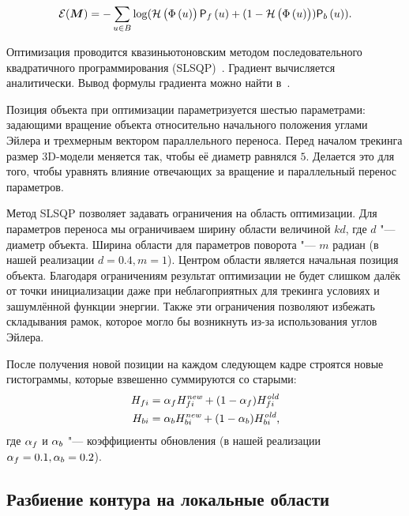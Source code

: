 \begin{equation}\label{eqn:err_func}
    \mathcal{E}(\bm{M}) = - \sum\limits_{\mathnormal{u} \in B}
        \log(\mathcal{H} \left( \Phi \left( \mathnormal{u} \right) \right) \mathsf{P}_f \left( \mathnormal{u} \right) + (1 - \mathcal{H} \left( \Phi \left( \mathnormal{u} \right) \right))\mathsf{P}_b \left( \mathnormal{u} \right))
\text{.}
\end{equation}

Оптимизация проводится квазиньютоновским методом последовательного
квадратичного программирования (SLSQP)~\cite{SLSQP}.
Градиент вычисляется аналитически.
Вывод формулы градиента можно найти в~\cite{Tjaden2018}.

Позиция объекта при оптимизации параметризуется шестью параметрами:
задающими вращение объекта относительно начального положения углами Эйлера
и трехмерным вектором параллельного переноса.
Перед началом трекинга размер 3D-модели меняется так, чтобы её диаметр равнялся
$5$.
Делается это для того, чтобы уравнять влияние отвечающих за вращение и
параллельный перенос параметров.

Метод SLSQP позволяет задавать ограничения на область оптимизации.
Для параметров переноса мы ограничиваем ширину области величиной $kd$,
где $d$ "--- диаметр объекта.
Ширина области для параметров поворота "--- $m$ радиан (в нашей реализации $d
=0.4, m = 1$).
Центром области является начальная позиция объекта.
Благодаря ограничениям результат оптимизации не будет слишком далёк от точки
инициализации даже при неблагоприятных для трекинга условиях и зашумлённой
функции энергии.
Также эти ограничения позволяют избежать складывания рамок, которое
могло бы возникнуть из-за использования углов Эйлера.

После получения новой позиции на каждом следующем кадре строятся новые
гистограммы, которые взвешенно суммируются со старыми:
\begin{align}
    H_{fi} &= \alpha_{f} H_{fi}^{\text{\it new}} + (1 - \alpha_{f})
        H_{fi}^{\text{\it old}} \\
    H_{bi} &= \alpha_{b} H_{bi}^{\text{\it new}} + (1 - \alpha_{b})
        H_{bi}^{\text{\it old}}
\text{,}
\end{align}
где $\alpha_{f}$ и $\alpha_{b}$ "--- коэффициенты обновления (в нашей реализации
$\alpha_{f} = 0.1, \alpha_{b} = 0.2$).

\subsection{Разбиение контура на локальные области}\label{local-areas}

